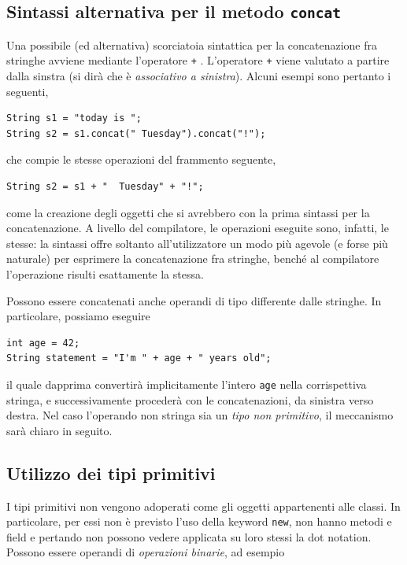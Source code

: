 \documentclass[\fontsizeclass,twocolumn]{\classname}
\theoremstyle{definition}
\theoremstyle{definition}
\begin{document}
\subsection{Sintassi alternativa per il metodo \texttt{concat}}

Una possibile (ed alternativa) scorciatoia sintattica per la concatenazione fra
stringhe avviene mediante l'operatore \texttt + . L'operatore \texttt + viene
valutato a partire dalla sinstra (si dirà che è \emph{associativo a sinistra}).
Alcuni esempi sono pertanto i seguenti,

\begin{lstlisting}
String s1 = "today is ";
String s2 = s1.concat(" Tuesday").concat("!");
\end{lstlisting}

che compie le stesse operazioni del frammento seguente,

\begin{lstlisting}
String s2 = s1 + "  Tuesday" + "!";
\end{lstlisting}

come la creazione degli oggetti che si avrebbero con la prima sintassi per la
concatenazione. A livello del compilatore, le operazioni eseguite sono,
infatti, le stesse: la sintassi offre soltanto all'utilizzatore un modo più
agevole (e forse più naturale) per esprimere la concatenazione fra stringhe,
benché al compilatore l'operazione risulti esattamente la stessa.

Possono essere concatenati anche operandi di tipo differente dalle stringhe. In
particolare, possiamo eseguire

\begin{lstlisting}
int age = 42;
String statement = "I'm " + age + " years old";
\end{lstlisting}

il quale dapprima convertirà implicitamente l'intero \texttt{age} nella
corrispettiva stringa, e successivamente procederà con le concatenazioni, da
sinistra verso destra. Nel caso l'operando non stringa sia un \emph{tipo non
primitivo}, il meccanismo sarà chiaro in seguito.

\clearpage

\subsection{Utilizzo dei tipi primitivi}

I tipi primitivi non vengono adoperati come gli oggetti appartenenti alle
classi. In particolare, per essi non è previsto l'uso della keyword
\texttt{new}, non hanno metodi e field e pertando non possono vedere applicata
su loro stessi la dot notation. Possono essere operandi di \emph{operazioni
binarie}, ad esempio
\end{document}
